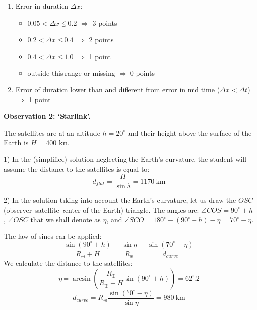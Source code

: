 \begin{enumerate}
\begin{itemize}
  \item $15~\mathrm{s} \le x < 16~\mathrm{s}$ or
    $18~\mathrm{s} < x \le 19~\mathrm{s}$ $\Longrightarrow$ 1 point
  \item outside this range $\Longrightarrow$ 0 points
  \end{itemize}
\item Error in duration $\Delta x$:
  \begin{itemize}
  \item $0.05 < \Delta x \le 0.2$ $\Longrightarrow$ 3 points
  \item $0.2 < \Delta x \le 0.4$ $\Longrightarrow$ 2 points
  \item $0.4 < \Delta x \le 1.0$ $\Longrightarrow$ 1 point
  \item outside this range or missing $\Longrightarrow$ 0 points
  \end{itemize}
\item Error of duration lower than and different from error in mid time
  ($\Delta x < \Delta t$) $\Longrightarrow$ 1 point
\end{enumerate}

\medskip
\textbf{Observation 2: `Starlink'.}

The satellites are at an altitude $h = 20^\circ$ and their height above the
surface of the Earth is $H = 400$ km.

1) In the (simplified) solution neglecting the Earth's curvature, the
student will assume the distance to the satellites is equal to:
\[
d_{flat} = \frac{H}{\sin h} = 1170~\mathrm{km}
\]


2) In the solution taking into account the Earth's curvature, let us draw
the $OSC$ (observer--satellite--center of the Earth) triangle. The angles
are: $\angle COS = 90^\circ + h$, $\angle OSC$ that we shall denote as
$\eta$, and $\angle SCO = 180^\circ - (90^\circ + h) - \eta = 70^\circ - \eta$.


The law of sines can be applied:
\[
\frac{\sin(90^\circ + h)}{R_\oplus + H} = \frac{\sin\eta}{R_\oplus}
= \frac{\sin(70^\circ - \eta)}{d_{curve}}
\]
We calculate the distance to the satellites:
\[
\eta = \arcsin\left(\frac{R_\oplus}{R_\oplus + H}\sin(90^\circ + h)\right)
= 62^\circ.2
\]
\[
d_{curve} = R_\oplus \frac{\sin(70^\circ - \eta)}{\sin\eta} = 980~\mathrm{km}
\]

